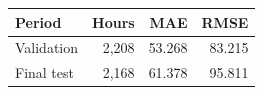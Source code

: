 \begin{tabular}{lrrr}
\toprule
Period & Hours & MAE & RMSE \\
\midrule
Validation & 2,208 & 53.268 & 83.215 \\
Final test & 2,168 & 61.378 & 95.811 \\
\bottomrule
\end{tabular}

